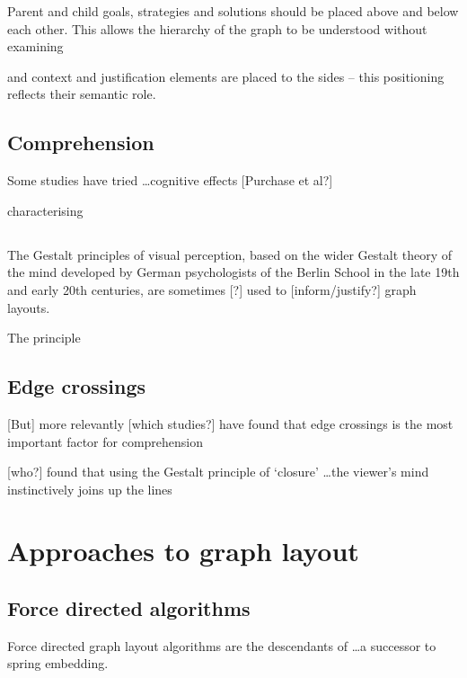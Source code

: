 Parent and child goals, strategies and solutions should be placed above and below each other. This allows the hierarchy of the graph to be understood without examining

and context and justification elements are placed to the sides -- this positioning reflects their semantic role.

\subsection{Comprehension}

Some studies have tried \ldots cognitive effects [Purchase et al?]

characterising 

\subsection{}


The Gestalt principles of visual perception,
based on the wider Gestalt theory of the mind developed by German psychologists of the Berlin School in the late 19th and early 20th centuries,
are sometimes [?] used to [inform/justify?] graph layouts.

The principle 




\subsection{Edge crossings}


[But] more relevantly [which studies?] have found that edge crossings is the most important factor for comprehension

[who?] found that using the Gestalt principle of `closure' \ldots the viewer's mind instinctively joins up the lines




\section{Approaches to graph layout}

\subsection{Force directed algorithms}

Force directed graph layout algorithms are the descendants of  \citet{tutte} \ldots a successor to \citet{tutte} spring embedding.

